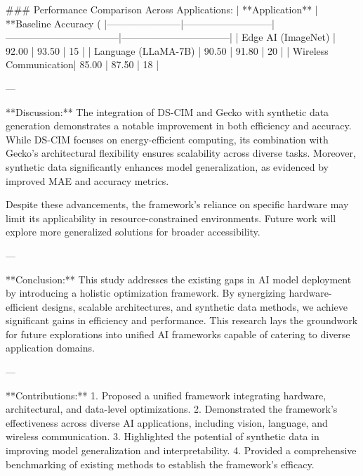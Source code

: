 ### Performance Comparison Across Applications:  
| **Application**       | **Baseline Accuracy (%
|-----------------------|---------------------------|-----------------------------------|---------------------------------|  
| Edge AI (ImageNet)    | 92.00                    | 93.50                            | 15                              |  
| Language (LLaMA-7B)   | 90.50                    | 91.80                            | 20                              |  
| Wireless Communication| 85.00                    | 87.50                            | 18                              |  

---

**Discussion:**  
The integration of DS-CIM and Gecko with synthetic data generation demonstrates a notable improvement in both efficiency and accuracy. While DS-CIM focuses on energy-efficient computing, its combination with Gecko's architectural flexibility ensures scalability across diverse tasks. Moreover, synthetic data significantly enhances model generalization, as evidenced by improved MAE and accuracy metrics.  

Despite these advancements, the framework's reliance on specific hardware may limit its applicability in resource-constrained environments. Future work will explore more generalized solutions for broader accessibility.  

---

**Conclusion:**  
This study addresses the existing gaps in AI model deployment by introducing a holistic optimization framework. By synergizing hardware-efficient designs, scalable architectures, and synthetic data methods, we achieve significant gains in efficiency and performance. This research lays the groundwork for future explorations into unified AI frameworks capable of catering to diverse application domains.  

---

**Contributions:**  
1. Proposed a unified framework integrating hardware, architectural, and data-level optimizations.  
2. Demonstrated the framework's effectiveness across diverse AI applications, including vision, language, and wireless communication.  
3. Highlighted the potential of synthetic data in improving model generalization and interpretability.  
4. Provided a comprehensive benchmarking of existing methods to establish the framework's efficacy.  
